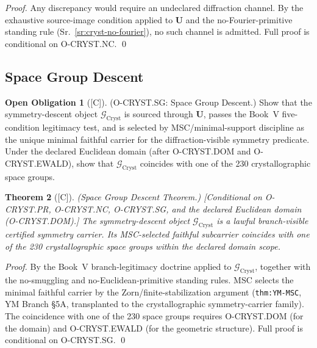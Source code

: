 \documentclass[12pt,oneside]{amsbook}
\theoremstyle{plain}
\newtheorem{theorem}{Theorem}[section]
\theoremstyle{definition}
\newtheorem{obligation}[theorem]{Open Obligation}
\theoremstyle{remark}
\newcommand{\status}[1]{\textup{[#1]}}
\begin{document}
\begin{proof}
Any discrepancy would require an undeclared diffraction channel.
By the exhaustive source-image condition applied to $\mathbf{U}$
and the no-Fourier-primitive standing rule
(Sr.~\ref{sr:cryst-no-fourier}), no such channel is admitted.
Full proof is conditional on O-CRYST.NC.
\qed
\end{proof}

\subsection{Space Group Descent}

\begin{obligation}[\status{C}]\label{ob:cryst-SG}
\textup{(O-CRYST.SG: Space Group Descent.)}
Show that the symmetry-descent object $\mathcal{G}_{\mathrm{Cryst}}$
is sourced through $\mathbf{U}$, passes the Book~V five-condition
legitimacy test, and is selected by MSC/minimal-support discipline
as the unique minimal faithful carrier for the diffraction-visible
symmetry predicate.  Under the declared Euclidean domain (after
O-CRYST.DOM and O-CRYST.EWALD), show that $\mathcal{G}_{\mathrm{Cryst}}$
coincides with one of the 230 crystallographic space groups.
\end{obligation}

\begin{theorem}[\status{C}]\label{thm:cryst-SG}
\textup{(Space Group Descent Theorem.)}
\textup{[Conditional on O-CRYST.PR, O-CRYST.NC, O-CRYST.SG, and
the declared Euclidean domain (O-CRYST.DOM).]}
The symmetry-descent object $\mathcal{G}_{\mathrm{Cryst}}$ is a
lawful branch-visible certified symmetry carrier.  Its MSC-selected
faithful subcarrier coincides with one of the 230 crystallographic
space groups within the declared domain scope.
\end{theorem}

\begin{proof}
By the Book~V branch-legitimacy doctrine applied to
$\mathcal{G}_{\mathrm{Cryst}}$, together with the no-smuggling
and no-Euclidean-primitive standing rules.  MSC selects the minimal
faithful carrier by the Zorn/finite-stabilization argument
(\texttt{thm:YM-MSC}, YM Branch §5A, transplanted to the
crystallographic symmetry-carrier family).  The coincidence with
one of the 230 space groups requires O-CRYST.DOM (for the domain)
and O-CRYST.EWALD (for the geometric structure).  Full proof is
conditional on O-CRYST.SG.
\qed
\end{proof}
\end{document}
